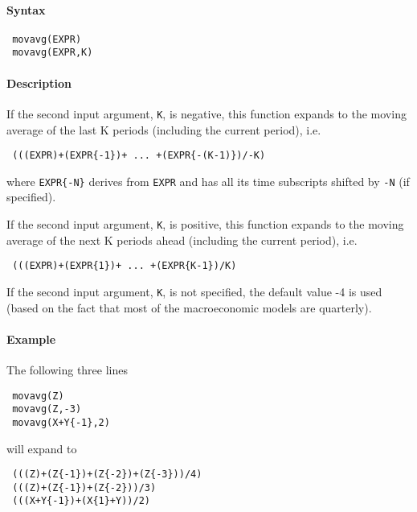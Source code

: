 


	\paragraph{Syntax}
 
 \begin{verbatim}
 movavg(EXPR)
 movavg(EXPR,K)
 \end{verbatim}
 
 \paragraph{Description}
 
 If the second input argument, \texttt{K}, is negative, this function
 expands to the moving average of the last K periods (including the
 current period), i.e.
 
 \begin{verbatim}
 (((EXPR)+(EXPR{-1})+ ... +(EXPR{-(K-1)})/-K)
 \end{verbatim}
 
 where \texttt{EXPR\{-N\}} derives from \texttt{EXPR} and has all its
 time subscripts shifted by \texttt{-N} (if specified).
 
 If the second input argument, \texttt{K}, is positive, this function
 expands to the moving average of the next K periods ahead (including the
 current period), i.e.
 
 \begin{verbatim}
 (((EXPR)+(EXPR{1})+ ... +(EXPR{K-1})/K)
 \end{verbatim}
 
 If the second input argument, \texttt{K}, is not specified, the default
 value -4 is used (based on the fact that most of the macroeconomic
 models are quarterly).
 
 \paragraph{Example}
 
 The following three lines
 
 \begin{verbatim}
 movavg(Z)
 movavg(Z,-3)
 movavg(X+Y{-1},2)
 \end{verbatim}
 
 will expand to
 
 \begin{verbatim}
 (((Z)+(Z{-1})+(Z{-2})+(Z{-3}))/4)
 (((Z)+(Z{-1})+(Z{-2}))/3)
 (((X+Y{-1})+(X{1}+Y))/2)
 \end{verbatim}


